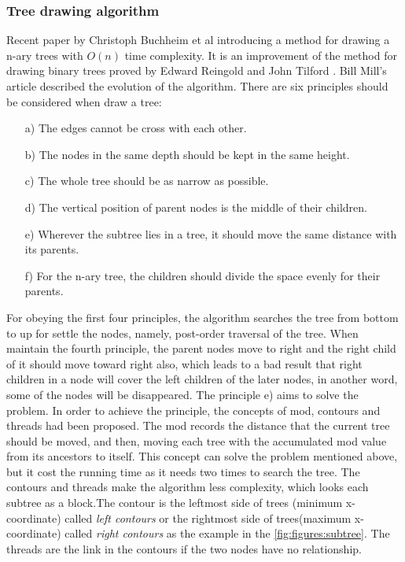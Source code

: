 \subsubsection{Tree drawing algorithm}
Recent paper by Christoph Buchheim et al \cite{buchheim2002improving} introducing a method for drawing a n-ary trees with \(O(n)\) time complexity. It is an improvement of the method for drawing binary trees proved by Edward Reingold and John Tilford \cite{reingold1981tidier}. Bill Mill’s article \cite{milldrawing} described the evolution of the algorithm. There are six principles should be considered when draw a tree:
\begin{itemize}
    \item[a)] The edges cannot be cross with each other.
    \item[b)] The nodes in the same depth should be kept in the same height.
    \item[c)] The whole tree should be as narrow as possible.
    \item[d)] The vertical position of parent nodes is the middle of their children.
    \item[e)] Wherever the subtree lies in a tree, it should move the same distance with its parents.
    \item[f)] For the n-ary tree, the children should divide the space evenly for their parents. 
  \end{itemize}

  For obeying the first four principles, the algorithm searches the tree from bottom to up for settle the nodes, namely, post-order traversal of the tree. When maintain the fourth principle, the parent nodes move to right and the right child of it should move toward right also, which leads to a bad result that right children in a node will cover the left children of the later nodes, in another word, some of the nodes will be disappeared. The principle e) aims to solve the problem. In order to achieve the principle, the concepts of mod, contours and threads had been proposed. The mod records the distance that the current tree should be moved, and then, moving each tree with the accumulated mod value from its ancestors to itself. This concept can solve the problem mentioned above, but it cost the running time as it needs two times to search the tree. The contours and threads make the algorithm less complexity, which looks each subtree as a block.The contour is the leftmost side of trees (minimum x-coordinate) called \textit{left contours} or the rightmost side of trees(maximum x-coordinate) called \textit{right contours} as the example in the \cref{fig:figures:subtree}. The threads are the link in the contours if the two nodes have no relationship.

